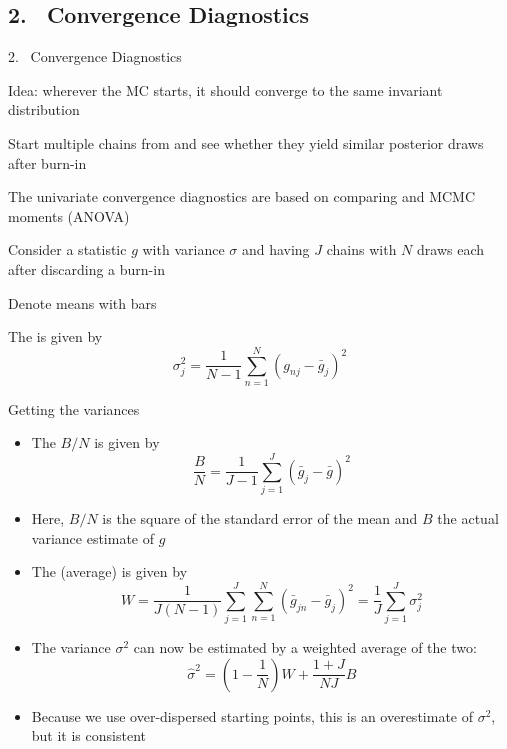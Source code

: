 \subsection{2.\ \textcite{BrooksGelman1998} Convergence Diagnostics}
\renewcommand{\Source}{\textcite{BrooksGelman1998}}
\begin{frame}{2.\ \textcite{BrooksGelman1998} Convergence Diagnostics}
\begin{witemize}
    \item Idea: wherever the MC starts, it should converge to the same invariant distribution
    \item Start multiple chains from  and see whether they yield similar posterior draws after burn-in
    \item The univariate convergence diagnostics are based on comparing  and  MCMC moments (ANOVA)
    \item Consider a statistic $g$ with variance $\sigma$ and having $J$ chains with $N$ draws each after discarding a burn-in
    \item Denote means with bars
    \item The  is given by
    \begin{equation}
    {\sigma _j^2} = \frac{1}{{N - 1}}\sum\limits_{n = 1}^N {{{\left( {{g_{nj}} - {{\bar g}_j}} \right)}^2}}
    \end{equation}
\end{witemize}
\end{frame}

\begin{frame}{Getting the variances}
\begin{itemize}
    \item The  $B/N$ is given by
    \begin{equation}
    \frac{B}{N} = \frac{1}{{J - 1}}\sum\limits_{j = 1}^J {{{\left( {{{\bar g}_j} - \bar g} \right)}^2}}
    \end{equation}
    \item Here, $B/N$ is the square of the standard error of the mean and $B$ the actual variance estimate of $g$
    \item The (average)  is given by
    \begin{equation}
    W = \frac{1}{{J\left( {N - 1} \right)}}\sum\limits_{j = 1}^J {\sum\limits_{n = 1}^N {{{\left( {{{\bar g}_{jn}} - {{\bar g}_j}} \right)}^2}} }  = \frac{1}{J}\sum\limits_{j = 1}^J \sigma _j^2
    \end{equation}
\item The variance $\sigma^2$ can now be estimated by a weighted average of the two:
\begin{equation}
{{\hat \sigma }^2} = \left( {1 - \frac{1}{N}} \right)W + \frac{{1 + J}}{{NJ}}B
\end{equation}
\item Because we use over-dispersed starting points, this is an overestimate of $\sigma^2$, but it is consistent
\end{itemize}
\end{frame}

